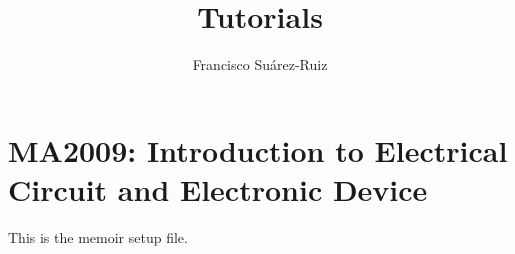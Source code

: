 \documentclass{memoir}
\title{Tutorials}
\author{Francisco Su\'{a}rez-Ruiz}
\begin{document}
\maketitle

\chapter{MA2009: Introduction to Electrical Circuit and Electronic Device}

This is the memoir setup file.
\end{document}
